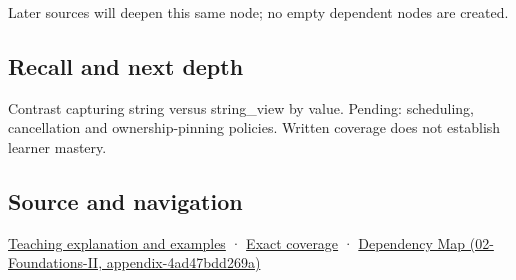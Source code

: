 Later sources will deepen this same node; no empty dependent nodes are created.

\subsection{Recall and next depth}\label{appendix-aea529eb5175-recall-and-next-depth}

Contrast capturing string versus string\_view by value. Pending: scheduling, cancellation and ownership-pinning policies. Written coverage does not establish learner mastery.

\subsection{Source and navigation}\label{appendix-aea529eb5175-source-and-navigation}

\hyperref[01-foundations-i-ch003-borrowed-views-and-deferred-work-need-an-owner-story]{Teaching explanation and examples} · \hyperref[appendix-fd090d982a15-m008---parts-113-126]{Exact coverage} · \href{../02-Foundations-II/main.pdf\#nameddest=appendix-4ad47bdd269a}{Dependency Map (02-Foundations-II, appendix-4ad47bdd269a)}
